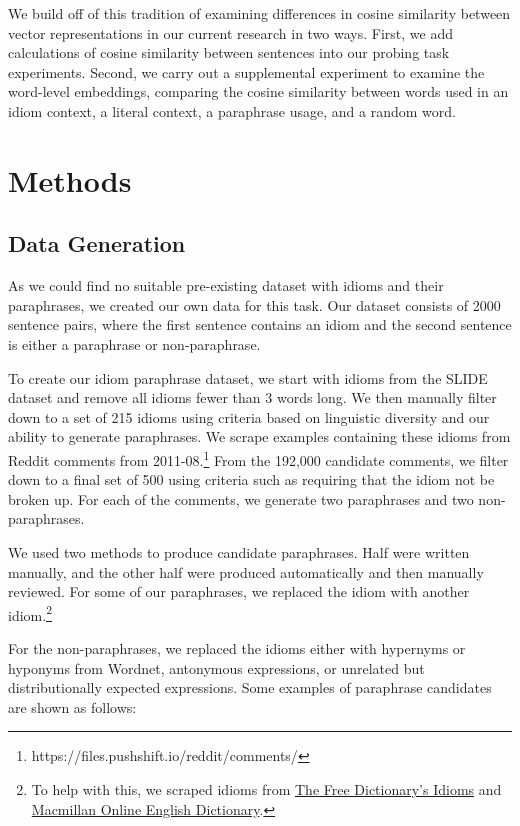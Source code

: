 \documentclass[11pt,a4paper]{article}
\begin{document}
We build off of this tradition of examining differences in cosine similarity between vector representations in our current research in two ways. First, we add calculations of cosine similarity between sentences into our probing task experiments. Second, we carry out a supplemental experiment to examine the word-level embeddings, comparing the cosine similarity between words used in an idiom context, a literal context, a paraphrase usage, and a random word.

\section{Methods}
\subsection{Data Generation}
As we could find no suitable pre-existing dataset with idioms and their paraphrases, we created our own data for this task. Our dataset consists of 2000 sentence pairs, where the first sentence contains an idiom and the second sentence is either a paraphrase or non-paraphrase.


To create our idiom paraphrase dataset, we start with idioms from the SLIDE \citet{Jochim2018SLIDEA} dataset and remove all idioms fewer than 3 words long. We then manually filter down to a set of 215 idioms using criteria based on linguistic diversity and our ability to generate paraphrases. We scrape examples containing these idioms from Reddit comments from 2011-08.\footnote{https://files.pushshift.io/reddit/comments/} From the 192,000 candidate comments, we filter down to a final set of 500 using criteria such as requiring that the idiom not be broken up. For each of the comments, we generate two paraphrases and two non-paraphrases.


We used two methods to produce candidate paraphrases. Half were written manually, and the other half were produced automatically and then manually reviewed. For some of our paraphrases, we replaced the idiom with another idiom.\footnote{To help with this, we scraped idioms from \href{https://idioms.thefreedictionary.com/}{The Free Dictionary’s Idioms} and \href{https://www.macmillandictionary.com/us/}{Macmillan Online English Dictionary}.}

For the non-paraphrases, we replaced the idioms either with hypernyms or hyponyms from Wordnet, antonymous expressions, or unrelated but distributionally expected expressions. Some examples of paraphrase candidates are shown as follows:
\end{document}
